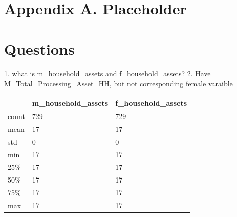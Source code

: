 \documentclass[12pt]{article}
\begin{document}
	
	\singlespacing

	
	
	
 
	
	\clearpage
	
	\onehalfspacing
	
	
	
	
	\clearpage
	
	
	
	
	\newpage


	\citet{awotide2014assessing}
	\citet{apu2011effect} 
	\citet{nwakor2011socio}
	\citet{wossen2017cassava}
	
	\clearpage
	
	\section*{Appendix A. Placeholder} \label{sec:appendixa}
	\section*{Questions}
	1. what is m\_household\_assets and f\_household\_assets?
	2. Have  M\_Total\_Processing\_Asset\_HH, but not corresponding female varaible
	
	\begin{table}[H]
		\begin{tabular}{lll} \hline
			& m\_household\_assets & f\_household\_assets \\ \hline
			count & 729                  & 729                  \\
			mean  & 17                   & 17                   \\
			std   & 0                    & 0                    \\
			min   & 17                   & 17                   \\
			25\%  & 17                   & 17                   \\
			50\%  & 17                   & 17                   \\
			75\%  & 17                   & 17                   \\
			max   & 17                   & 17                  \\ \hline
		\end{tabular}
	\end{table}
\end{document}
